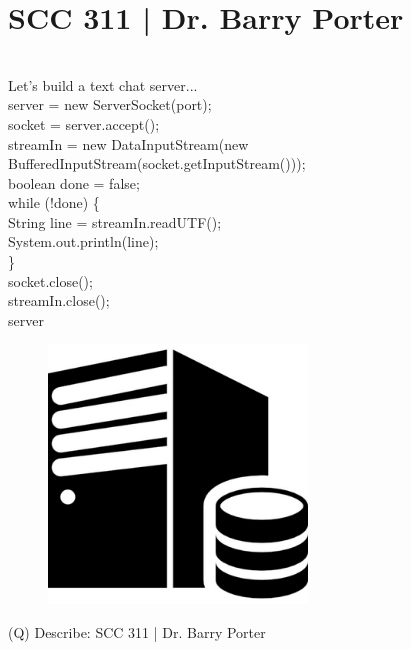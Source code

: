 \documentclass[12pt]{article}
\begin{document}
\section{SCC 311 | Dr. Barry Porter}
\\
Let's build a text chat server...\\
server = new ServerSocket(port);\\
socket = server.accept();\\
streamIn = new DataInputStream(new \\
BufferedInputStream(socket.getInputStream()));\\
boolean done = false;\\
while (!done) \{\\
String line = streamIn.readUTF();\\
System.out.println(line);\\
\}\\
socket.close();\\
streamIn.close();\\
server\\
\begin{figure}[H]
\includegraphics[width=0.5\linewidth]{page7-image-1.png}
\end{figure}
\clearpage
(Q)
Describe: SCC 311 | Dr. Barry Porter
\clearpage
\end{document}
